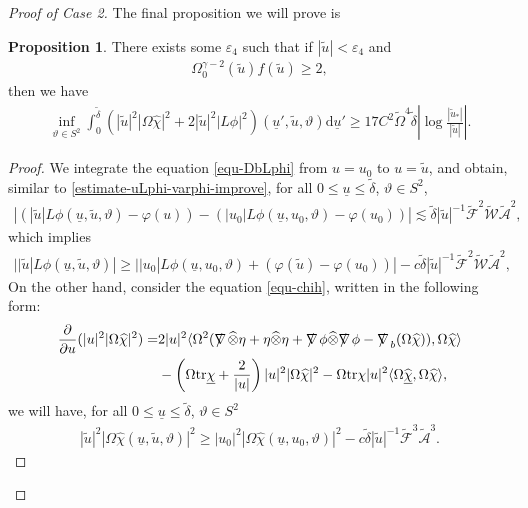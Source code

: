 \documentclass[11pt,reqno]{amsart}
\theoremstyle{definition}
\newtheorem{proposition}{Proposition}[section]
\numberwithin{equation}{section}
\newcommand{\D}{\mathrm{d}}
\newcommand{\tr}{\mathrm{tr}}
\def\chib{\underline{\chi}}
\def\chibh{\widehat{\underline{\chi}}}
\def\chih{\widehat{\chi}}
\def\tr{\mathrm{tr}}
\def\tensor{\widehat{\otimes}}
\def\ub{\underline{u}}
\newcommand{\tdelta}{\widetilde{\delta}}
\newcommand{\tOmega}{\widetilde{\Omega}}
\newcommand{\tu}{\widetilde{u}}
\def\nablas{\mbox{$\nabla \mkern -13mu /$ }}
\begin{document}
\begin{proof}[Proof of Case 2]
The final proposition we will prove is
\begin{proposition}
There exists some $\varepsilon_4$ such that if $|\tu|<\varepsilon_4$ and 
\begin{align*}
\Omega_0^{\gamma-2}(\widetilde{u})f(\tu)\ge2,
\end{align*}
then we have
 \begin{align}\label{conditiontrappedLphiutildepre}
\inf_{\vartheta\in S^2}\int_0^{\tdelta}(|\tu|^2|\Omega\chih|^2+2|\tu|^2|L\phi|^2)(\ub',\tu,\vartheta)\D\ub'\ge 17C^2\tOmega^4\tdelta\left|\log\frac{|\tu_*|}{|\tu|}\right|.
\end{align}
\end{proposition}
\begin{proof}
We integrate the equation \eqref{equ-DbLphi} from $u=u_0$ to $u=\tu$, and obtain, similar to \eqref{estimate-uLphi-varphi-improve}, for all $0\le\ub\le\tdelta$, $\vartheta\in S^2$,
\begin{align*}
|(|\widetilde{u}|L\phi(\ub,\widetilde{u},\vartheta)-\varphi(u))-(|u_0|L\phi(\ub,u_0,\vartheta)-\varphi(u_0))|\lesssim\tdelta|\widetilde{u}|^{-1}\widetilde{\mathscr{F}}^2\widetilde{\mathscr{W}}\widetilde{\mathcal{A}}^2,
\end{align*}
which implies
\begin{align}\label{estimate-utildeLphi-lower}
||\widetilde{u}|L\phi(\ub,\widetilde{u},\vartheta)|\ge||u_0|L\phi(\ub,u_0,\vartheta)+(\varphi(\widetilde{u})-\varphi(u_0))|-c\tdelta|\widetilde{u}|^{-1}\widetilde{\mathscr{F}}^2\widetilde{\mathscr{W}}\widetilde{\mathcal{A}}^2,
\end{align}
On the other hand, consider the equation \eqref{equ-chih}, written in the following form:
\begin{equation*}
\begin{split}
\frac{\partial}{\partial u}(|u|^2|\Omega\chih|^2)
=&2|u|^2\langle\Omega^2(\nablas\tensor\eta+\eta\tensor\eta+\nablas\phi\tensor\nablas\phi-\nablas_b(\Omega\chih)),\Omega\chih\rangle\\
&-\left(\Omega\tr\chib+\frac{2}{|u|}\right)|u|^2|\Omega\chih|^2-\Omega\tr\chi|u|^2\langle\Omega\chibh,\Omega\chih\rangle,
\end{split}
\end{equation*}
we will have, for all $0\le\ub\le\tdelta$, $\vartheta\in S^2$
\begin{align}\label{estimate-utildechih-lower}
|\tu|^2|\Omega\chih(\ub,\tu,\vartheta)|^2\ge|u_0|^2|\Omega\chih(\ub,u_0,\vartheta)|^2-c\tdelta|\tu|^{-1}\widetilde{\mathscr{F}}^3\widetilde{\mathcal{A}}^3.
\end{align}



\end{proof}
\end{proof}
\end{document}
